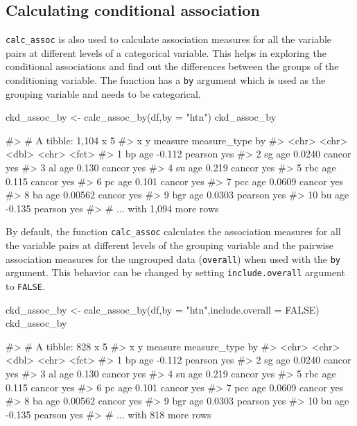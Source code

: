 \hypertarget{calculating-conditional-association}{%
\subsection{Calculating conditional
association}\label{calculating-conditional-association}}

\texttt{calc\_assoc} is also used to calculate association measures for
all the variable pairs at different levels of a categorical variable.
This helps in exploring the conditional associations and find out the
differences between the groups of the conditioning variable. The
function has a \texttt{by} argument which is used as the grouping
variable and needs to be categorical.

\begin{Schunk}
\begin{Sinput}
ckd_assoc_by <- calc_assoc_by(df,by = "htn")
ckd_assoc_by
\end{Sinput}
\begin{Soutput}
#> # A tibble: 1,104 x 5
#>    x     y      measure measure_type by   
#>    <chr> <chr>    <dbl> <chr>        <fct>
#>  1 bp    age   -0.112   pearson      yes  
#>  2 sg    age    0.0240  cancor       yes  
#>  3 al    age    0.130   cancor       yes  
#>  4 su    age    0.219   cancor       yes  
#>  5 rbc   age    0.115   cancor       yes  
#>  6 pc    age    0.101   cancor       yes  
#>  7 pcc   age    0.0609  cancor       yes  
#>  8 ba    age    0.00562 cancor       yes  
#>  9 bgr   age    0.0303  pearson      yes  
#> 10 bu    age   -0.135   pearson      yes  
#> # ... with 1,094 more rows
\end{Soutput}
\end{Schunk}

By default, the function \texttt{calc\_assoc} calculates the association
measures for all the variable pairs at different levels of the grouping
variable and the pairwise association measures for the ungrouped data
(\texttt{overall}) when used with the \texttt{by} argument. This
behavior can be changed by setting \texttt{include.overall} argument to
\texttt{FALSE}.

\begin{Schunk}
\begin{Sinput}
ckd_assoc_by <- calc_assoc_by(df,by = "htn",include.overall = FALSE)
ckd_assoc_by
\end{Sinput}
\begin{Soutput}
#> # A tibble: 828 x 5
#>    x     y      measure measure_type by   
#>    <chr> <chr>    <dbl> <chr>        <fct>
#>  1 bp    age   -0.112   pearson      yes  
#>  2 sg    age    0.0240  cancor       yes  
#>  3 al    age    0.130   cancor       yes  
#>  4 su    age    0.219   cancor       yes  
#>  5 rbc   age    0.115   cancor       yes  
#>  6 pc    age    0.101   cancor       yes  
#>  7 pcc   age    0.0609  cancor       yes  
#>  8 ba    age    0.00562 cancor       yes  
#>  9 bgr   age    0.0303  pearson      yes  
#> 10 bu    age   -0.135   pearson      yes  
#> # ... with 818 more rows
\end{Soutput}
\end{Schunk}

